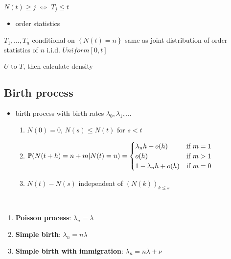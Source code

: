 \begin{fact}
    $N(t) \geq j$ $\iff$ $T_j \leq t$
\end{fact}
\begin{itemize}
    \item order statistics
\end{itemize}

\begin{thm}
    $T_1, \dots, T_n$ conditional on $\left\{ N(t) = n \right\}$ same as joint distribution of order statistics of $n$ i.i.d. $Uniform[0, t]$
\end{thm}
\begin{pf}
    $U$ to $T$, then calculate density
\end{pf}

\subsection{Birth process}\label{subsec:birth-process}

\begin{itemize}
    \item birth process with birth rates $\lambda_0, \lambda_1, \dots$
    \begin{enumerate}
        \item $N(0) = 0$, $N(s) \leq N(t)$ for $s < t$
        \item $\mathbb{P}(N(t + h) = n + m| N(t) = n) = \begin{cases}
                                                     \lambda_n h + o(h) & \text{if } m = 1\\
                                                     o(h) & \text{if } m > 1\\
                                                     1 - \lambda_n h + o(h) & \text{if } m = 0\\
        \end{cases}$
        \item $N(t) - N(s)$ independent of $(N(k))_{k \leq s}$
    \end{enumerate}
\end{itemize}

\begin{example}\,
    \begin{enumerate}
        \item \textbf{Poisson process}: $\lambda_n = \lambda$
        \item \textbf{Simple birth}: $\lambda_n = n\lambda$
        \item \textbf{Simple birth with immigration}: $\lambda_n = n\lambda + \nu$
    \end{enumerate}
\end{example}

